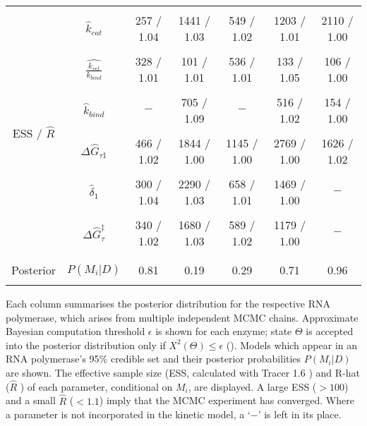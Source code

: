 \documentclass[10pt,letterpaper]{article}
\begin{document}
\begin{table}[!ht]
\begin{adjustwidth}{-2.25in}{0in}
{\begin{tabular}{|cc|cc|cc|c|}
&&&&&& \\

\hline
&&&&&& \\




\multirow{12}{1.4cm}{ESS  / $\hat{R}$} &$\hat{k}_{cat}$ & 257 / 1.04   & 1441 / 1.03 & 549 / 1.02 & 1203 / 1.01  & 2110 / 1.00 \\
&&&&&& \\

 &$\hat{\frac{k_{rel}}{k_{bind}}}$  & 328 / 1.01   & 101 / 1.01 & 536 / 1.01 & 133 / 1.05  & 106 / 1.00 \\
&&&&&& \\


&$\hat{k}_{bind}$    & $-$   & 705 / 1.09 & $-$ & 516 / 1.02  & 154 / 1.00 \\
&&&&&& \\

&$\Delta \hat{G}_{\tau 1}$ & 466 / 1.02   & 1844 / 1.00 & 1145 / 1.00 & 2769 / 1.00  & 1626 / 1.02 \\
&&&&&& \\



&$\hat{\delta}_1$   & 300 / 1.04   & 2290 / 1.03 & 658 / 1.01 & 1469 / 1.00  & $-$ \\
&&&&&& \\

&$\Delta \hat{G}^\ddag_{\tau}$   & 340 / 1.02   & 1680 / 1.03 & 589 / 1.02 & 1179 / 1.00  & $-$ \\






&&&&&& \\
\hline

&&&&&& \\
Posterior &$P(M_i|D)$  & 0.81  & 0.19 & 0.29 & 0.71 & 0.96  \\
&&&&&& \\
\hline

\end{tabular}
}
\begin{flushleft} Each column summarises the posterior distribution for the respective RNA polymerase, which arises from multiple independent MCMC chains. Approximate Bayesian computation threshold $\epsilon$ is shown for each enzyme; state $\Theta$ is accepted into the posterior distribution only if $X^2(\Theta) \leq \epsilon$ (). Models which appear in an RNA polymerase's 95\% credible set and their posterior probabilities $P(M_i|D)$ are shown. The effective sample size (ESS, calculated with Tracer 1.6 \cite{rambaut2013tracer}) and R-hat ($\hat{R}$ \cite{gelman1992inference, brooks1998general, brooks2011handbook}) of each parameter, conditional on $M_i$, are displayed. A large ESS ($> 100$) and a small $\hat{R}$ ($< 1.1$) imply that the MCMC experiment has converged. Where a parameter is not incorporated in the kinetic model, a `$-$' is left in its place.
\end{flushleft}
\label{table1}
\end{adjustwidth}
\end{table}
\end{document}
